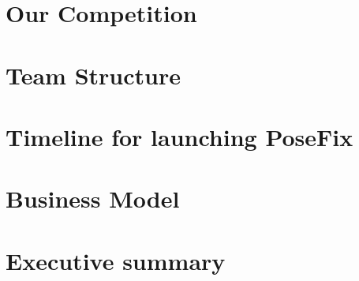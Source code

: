 \documentclass[a4paper, 11pt]{report}
\begin{document}
	{
		\FloatBarrier
		\chapter{Our Competition}
		\label{chp:competition}
		
	}

	{
		\FloatBarrier
		\chapter{Team Structure}
		\label{chp:team_structure}
		
	}

	{
		\FloatBarrier
		\chapter{Timeline for launching PoseFix}
		\label{chp:timeline}
		
	}

	{
		\FloatBarrier
		\chapter{Business Model}
		\label{chp:business_model}
		
	}

	{
		\FloatBarrier
		\chapter{Executive summary}
		\label{chp:summary}
		
	}

	{
		\FloatBarrier
		\newpage
		\printbibliography[title = References]
	}
\end{document}
